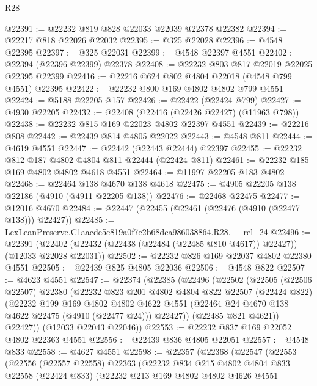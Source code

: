 \begin{lexlean}{R28}
\begin{coremodule}
@22391 := @22232 @819 @828 @22033 @22039 @22378 @22382
@22394 := @22217 @818 @22026 @22032
@22395 := @325 @22028
@22396 := @4548 @22395
@22397 := @325 @22031
@22399 := @4548 @22397 @4551
@22402 := @22394 (@22396 @22399) @22378
@22408 := @22232 @803 @817 @22019 @22025 @22395 @22399
@22416 := @22216 @624 @802 @4804 @22018 (@4548 @799 @4551) @22395
@22422 := @22232 @800 @169 @4802 @4802 @799 @4551
@22424 := @5188 @22205 @157
@22426 := @22422 (@22424 @799)
@22427 := @4930 @22205
@22432 := @22408 (@22416 (@22426 @22427) (@11963 @798))
@22438 := @22232 @815 @169 @22023 @4802 @22397 @4551
@22439 := @22216 @808
@22442 := @22439 @814 @4805 @22022
@22443 := @4548 @811
@22444 := @4619 @4551
@22447 := @22442 (@22443 @22444) @22397
@22455 := @22232 @812 @187 @4802 @4804 @811 @22444 (@22424 @811)
@22461 := @22232 @185 @169 @4802 @4802 @4618 @4551
@22464 := @11997 @22205 @183 @4802
@22468 := @22464 @138 @4670 @138 @4618
@22475 := @4905 @22205 @138 @22186 (@4910 (@4911 @22205 @138))
@22476 := @22468 @22475
@22477 := @12016 @4670
@22484 := @22447 (@22455 (@22461 (@22476 (@4910 (@22477 @138))) @22427))
@22485 := LexLeanPreserve.C1aacde5c819a0f7e2b68dca986038864.R28.__rel_24
@22496 := @22391
    (@22402 (@22432 (@22438 (@22484 (@22485 @810 @4617)) @22427)) (@12033 @22028 @22031))
@22502 := @22232 @826 @169 @22037 @4802 @22380 @4551
@22505 := @22439 @825 @4805 @22036
@22506 := @4548 @822
@22507 := @4623 @4551
@22547 := @22374
    (@22385
      (@22496
        (@22502
          (@22505
            (@22506 @22507)
            @22380
            (@22232
              @823
              @201
              @4802
              @4804
              @822
              @22507
              (@22424 @822)
              (@22232
                @199
                @169
                @4802
                @4802
                @4622
                @4551
                (@22464 @24 @4670 @138 @4622 @22475 (@4910 (@22477 @24)))
                @22427))
            (@22485 @821 @4621))
          @22427))
      (@12033 @22043 @22046))
@22553 := @22232 @837 @169 @22052 @4802 @22363 @4551
@22556 := @22439 @836 @4805 @22051
@22557 := @4548 @833
@22558 := @4627 @4551
@22598 := @22357
    (@22368
      (@22547
        (@22553
          (@22556
            (@22557 @22558)
            @22363
            (@22232
              @834
              @215
              @4802
              @4804
              @833
              @22558
              (@22424 @833)
              (@22232
                @213
                @169
                @4802
                @4802
                @4626
                @4551

\end{coremodule}
\end{lexlean}
